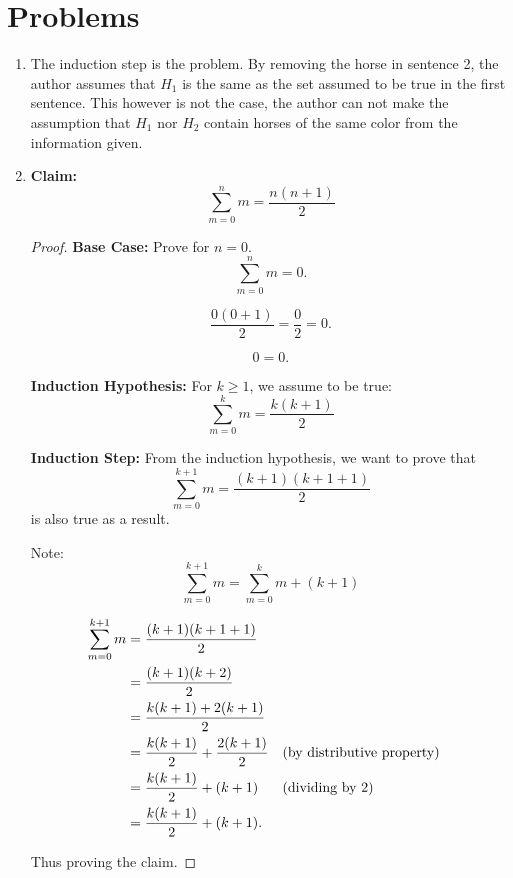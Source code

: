 \documentclass{article}
\begin{document}
\section{Problems}
\begin{enumerate}
    \item %
        The induction step is the problem. By removing the horse in sentence 2, the author assumes that $H_1$ is the same as the set assumed to be true in the first sentence. This however is not the case, the author can not make the assumption that $H_1$ nor $H_2$ contain horses of the same color from the information given.
    \item %
        \textbf{Claim:}
        \[
            \sum_{m=0}^n m = \frac{n(n+1)}{2}
        \]
        \begin{proof}
            \textbf{Base Case:} Prove for $n = 0$.
            \[
                \sum_{m=0}^n m = 0.
            \]

            \[
                \frac{0(0+1)}{2} = \frac{0}{2} = 0.
            \]

            \[
                0 = 0.
            \]

            \textbf{Induction Hypothesis:} For $k \geq 1$,  we assume to be true:
            \[
                \sum_{m=0}^k m = \frac{k(k+1)}{2}
            \]

            \textbf{Induction Step:} From the induction hypothesis, we want to prove that
            \[
                \sum_{m=0}^{k+1} m = \frac{(k+1)(k+1+1)}{2}
            \]
            is also true as a result.

            Note:
            \[
                \sum_{m=0}^{k+1} m = \sum_{m=0}^k m + (k + 1)
            \]

            \begin{align*}
                \sum_{m=0}^{k+1} m &= \frac{(k+1)(k+1+1)}{2} \\
                &= \frac{(k+1)(k+2)}{2} \\
                &= \frac{k(k+1) + 2(k+1)}{2} \\
                &= \frac{k(k+1)}{2} + \frac{2(k+1)}{2} &&\text{(by distributive property)}\\
                &= \frac{k(k+1)}{2} + (k+1) &&\text{(dividing by 2)}\\
                &= \frac{k(k+1)}{2} + (k+1).
                &&\qedhere
            \end{align*}

            Thus proving the claim.
        \end{proof}
\end{enumerate}
\end{document}
